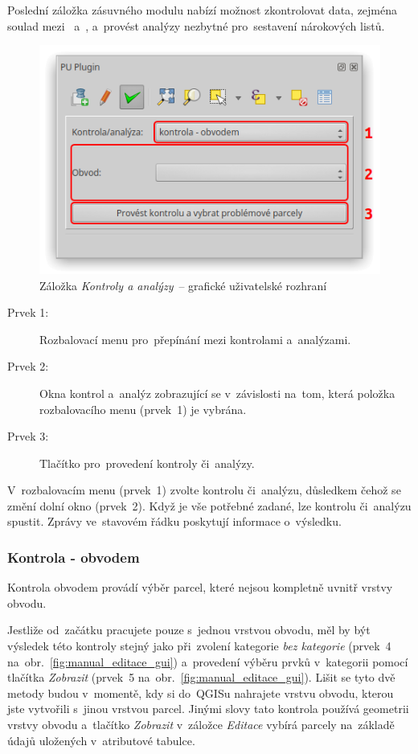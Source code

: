 Poslední záložka zásuvného modulu nabízí možnost zkontrolovat data, zejména soulad mezi~ a~, a~provést analýzy nezbytné pro~sestavení nárokových listů.

	\begin{figure}[H]
		\centering
		\includegraphics[width=.55\textwidth]{./pictures/ca_gui.png}
		\caption[Záložka \textit{Kontroly a analýzy}~– grafické uživatelské rozhraní]{Záložka \textit{Kontroly a analýzy}~– grafické uživatelské rozhraní}
		\label{fig:manual_ca_gui}
 	\end{figure}

\begin{description}
	\item[Prvek 1:] Rozbalovací menu pro~přepínání mezi kontrolami a~analýzami.
	\item[Prvek 2:] Okna kontrol a~analýz zobrazující se v~závislosti na~tom, která položka rozbalovacího menu (prvek~1) je vybrána.
	\item[Prvek 3:] Tlačítko pro~provedení kontroly či~analýzy.
\end{description}

V~rozbalovacím menu (prvek~1) zvolte kontrolu či~analýzu, důsledkem čehož se změní dolní okno (prvek~2). Když je vše potřebné zadané, lze kontrolu či~analýzu spustit. Zprávy ve~stavovém řádku poskytují informace o~výsledku.

\subsubsection{Kontrola - obvodem}
\label{manual_kontrola_obvodem}

Kontrola obvodem provádí výběr parcel, které nejsou kompletně uvnitř vrstvy obvodu.

Jestliže od~začátku pracujete pouze s~jednou vrstvou obvodu, měl by být výsledek této kontroly stejný jako při~zvolení kategorie \textit{bez kategorie} (prvek~4 na~obr.~\ref{fig:manual_editace_gui}) a~provedení výběru prvků v~kategorii pomocí tlačítka \textit{Zobrazit} (prvek~5 na~obr.~\ref{fig:manual_editace_gui}). Lišit se tyto dvě metody budou v~momentě, kdy si do~QGISu nahrajete vrstvu obvodu, kterou jste vytvořili s~jinou vrstvou parcel. Jinými slovy tato kontrola používá geometrii vrstvy obvodu a~tlačítko \textit{Zobrazit} v~záložce \textit{Editace} vybírá parcely na~základě údajů uložených v~atributové tabulce.


